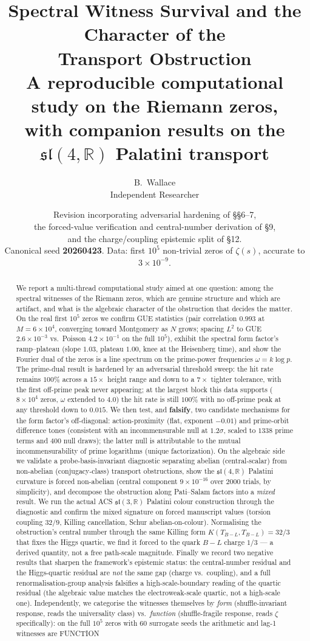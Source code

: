 \documentclass[11pt]{article}
\title{\textbf{Spectral Witness Survival and the Character of the\\ Transport Obstruction}\\[4pt]
\large A reproducible computational study on the Riemann zeros,\\
with companion results on the $\mathfrak{sl}(4,\mathbb{R})$ Palatini transport}
\author{B.~Wallace\\ \small Independent Researcher}
\date{\small Revision incorporating adversarial hardening of \S\S6--7,\\
\small the forced-value verification and central-number derivation of \S9,\\
\small and the charge/coupling epistemic split of \S12. \\[2pt]
\small Canonical seed \textbf{20260423}. Data: first $10^5$ non-trivial zeros of $\zeta(s)$, accurate to $3\times10^{-9}$.}
\newcommand{\sltwo}{\mathfrak{sl}(4,\mathbb{R})}
\newcommand{\R}{\mathbb{R}}
\begin{document}
\maketitle
\thispagestyle{fancy}

\begin{abstract}
We report a multi-thread computational study aimed at one question: among the spectral witnesses of the Riemann zeros, which are genuine structure and which are artifact, and what is the algebraic character of the obstruction that decides the matter. On the real first $10^5$ zeros we confirm GUE statistics (pair correlation $0.993$ at $M=6\times10^4$, converging toward Montgomery as $N$ grows; spacing $L^2$ to GUE $2.6\times10^{-3}$ vs.\ Poisson $4.2\times10^{-1}$ on the full $10^5$), exhibit the spectral form factor's ramp--plateau (slope $1.03$, plateau $1.00$, knee at the Heisenberg time), and show the Fourier dual of the zeros is a line spectrum on the prime-power frequencies $\omega=k\log p$. The prime-dual result is hardened by an adversarial threshold sweep: the hit rate remains $100\%$ across a $15\times$ height range and down to a $7\times$ tighter tolerance, with the first off-prime peak never appearing; at the largest block this data supports ($8\times10^4$ zeros, $\omega$ extended to $4.0$) the hit rate is still $100\%$ with no off-prime peak at any threshold down to $0.015$. We then test, and \textbf{falsify}, two candidate mechanisms for the form factor's off-diagonal: action-proximity (flat, exponent $-0.01$) and prime-orbit difference tones (consistent with an incommensurable null at $1.2\sigma$, scaled to $1338$ prime terms and $400$ null draws); the latter null is attributable to the mutual incommensurability of prime logarithms (unique factorization). On the algebraic side we validate a probe-basis-invariant diagnostic separating abelian (central-scalar) from non-abelian (conjugacy-class) transport obstructions, show the $\sltwo$ Palatini curvature is forced non-abelian (central component $9\times10^{-16}$ over $2000$ trials, by simplicity), and decompose the obstruction along Pati--Salam factors into a \emph{mixed} result. We run the actual ACS $\mathfrak{sl}(3,\R)$ Palatini colour construction through the diagnostic and confirm the mixed signature on forced manuscript values (torsion coupling $32/9$, Killing cancellation, Schur abelian-on-colour). Normalising the obstruction's central number through the same Killing form $K(T_{B-L},T_{B-L})=32/3$ that fixes the Higgs quartic, we find it forced to the quark $B\!-\!L$ charge $1/3$ --- a derived quantity, not a free path-scale magnitude. Finally we record two negative results that sharpen the framework's epistemic status: the central-number residual and the Higgs-quartic residual are \emph{not} the same gap (charge vs.\ coupling), and a full renormalisation-group analysis falsifies a high-scale-boundary reading of the quartic residual (the algebraic value matches the electroweak-scale quartic, not a high-scale one). Independently, we categorise the witnesses themselves by \emph{form} (shuffle-invariant response, reads the universality class) vs.\ \emph{function} (shuffle-fragile response, reads $\zeta$ specifically): on the full $10^5$ zeros with $60$ surrogate seeds the arithmetic and lag-1 witnesses are FUNCTION 
\end{abstract}
\end{document}
